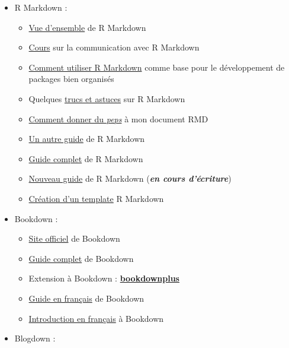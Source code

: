 \documentclass[
]{book}
\providecommand{\tightlist}{%
  \setlength{\itemsep}{0pt}\setlength{\parskip}{0pt}}
\begin{document}
\begin{itemize}
\tightlist
\item
  R Markdown :

  \begin{itemize}
  \tightlist
  \item
    \href{https://rmarkdown.rstudio.com/lesson-1.html}{Vue d'ensemble} de R Markdown
  \item
    \href{https://ysc-rmarkdown.netlify.app/}{Cours} sur la communication avec R Markdown
  \item
    \href{https://emilyriederer.netlify.app/post/rmarkdown-driven-development/}{Comment utiliser R Markdown}
    comme base pour le développement de packages bien organisés
  \item
    Quelques \href{https://www.dataquest.io/blog/r-markdown-tips-tricks-and-shortcuts/}{trucs et astuces}
    sur R Markdown
  \item
    \href{https://holtzy.github.io/Pimp-my-rmd/}{Comment donner du \emph{peps}}
    à mon document RMD
  \item
    \href{https://www.dataquest.io/blog/r-markdown-guide-cheatsheet/}{Un autre guide}
    de R Markdown
  \item
    \href{https://bookdown.org/yihui/rmarkdown/}{Guide complet} de R Markdown
  \item
    \href{https://bookdown.org/yihui/rmarkdown-cookbook/}{Nouveau guide}
    de R Markdown (\textbf{\emph{en cours d'écriture}})
  \item
    \href{https://danawanzer.com/using-r-for-immediate-reporting-in-evaluation/}{Création d'un template}
    R Markdown
  \end{itemize}
\item
  Bookdown :

  \begin{itemize}
  \tightlist
  \item
    \href{https://bookdown.org/home/about/}{Site officiel} de Bookdown
  \item
    \href{https://bookdown.org/yihui/bookdown/}{Guide complet} de Bookdown
  \item
    Extension à Bookdown : \href{https://bookdown.org/baydap/bookdownplus/}{\textbf{bookdownplus}}
  \item
    \href{https://statistique-et-logiciel-r.com/creer-un-livre-document-avec-bookdown/}{Guide en français}
    de Bookdown
  \item
    \href{https://thinkr.fr/rediger-avec-bookdown-pourquoi-comment/}{Introduction en français}
    à Bookdown
  \end{itemize}
\item
  Blogdown :


\end{itemize}
\end{document}
